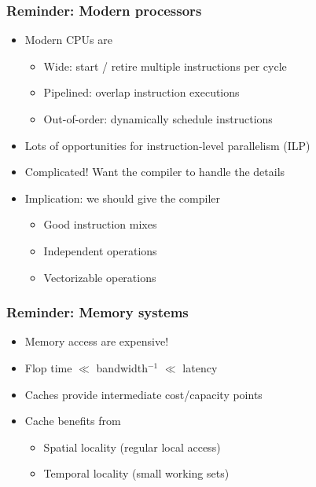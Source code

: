 \documentclass{beamer}
\begin{document}
\begin{frame}
  \titlepage
\end{frame}


\begin{frame}
  \frametitle{Reminder: Modern processors}

  \begin{itemize}
  \item Modern CPUs are
    \begin{itemize}
    \item Wide: start / retire multiple instructions per cycle
    \item Pipelined: overlap instruction executions
    \item Out-of-order: dynamically schedule instructions
    \end{itemize}
  \item Lots of opportunities for instruction-level parallelism (ILP)
  \item Complicated!  Want the compiler to handle the details
  \item Implication: we should give the compiler
    \begin{itemize}
    \item Good instruction mixes
    \item Independent operations
    \item Vectorizable operations
    \end{itemize}
  \end{itemize}
  
\end{frame}


\begin{frame}
  \frametitle{Reminder: Memory systems}

  \begin{itemize}
  \item Memory access are expensive!
  \item Flop time $\ll$ bandwidth$^{-1}$ $\ll$ latency
  \item Caches provide intermediate cost/capacity points
  \item Cache benefits from
    \begin{itemize}
    \item Spatial locality (regular local access)
    \item Temporal locality (small working sets)
    \end{itemize}
  \end{itemize}
  
\end{frame}
\end{document}

